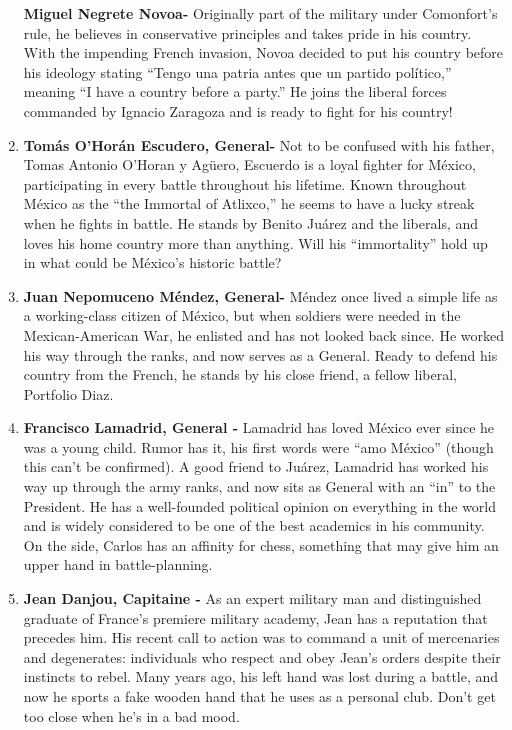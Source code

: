 \documentclass[10pt, letterpaper]{article}
\begin{document}
\begin{enumerate}
  \textbf{Miguel Negrete Novoa-} Originally part of the military under
  Comonfort's rule, he believes in conservative principles and takes
  pride in his country. With the impending French invasion, Novoa
  decided to put his country before his ideology stating ``Tengo una
  patria antes que un partido político,'' meaning ``I have a country
  before a party.'' He joins the liberal forces commanded by Ignacio
  Zaragoza and is ready to fight for his country!
  
\item
  
  \textbf{Tomás O'Horán Escudero, General-} Not to be confused with his
  father, Tomas Antonio O'Horan y Agüero, Escuerdo is a loyal fighter
  for México, participating in every battle throughout his lifetime.
  Known throughout México as the ``the Immortal of Atlixco,'' he seems
  to have a lucky streak when he fights in battle. He stands by Benito
  Juárez and the liberals, and loves his home country more than
  anything. Will his ``immortality'' hold up in what could be México's
  historic battle?
  
\item
  
  \textbf{Juan Nepomuceno Méndez, General-} Méndez once lived a simple
  life as a working-class citizen of México, but when soldiers were
  needed in the Mexican-American War, he enlisted and has not looked
  back since. He worked his way through the ranks, and now serves as a
  General. Ready to defend his country from the French, he stands by his
  close friend, a fellow liberal, Portfolio Diaz.
  
\item
  
  \textbf{Francisco Lamadrid, General -} Lamadrid has loved México ever
  since he was a young child. Rumor has it, his first words were ``amo
  México'' (though this can't be confirmed). A good friend to Juárez,
  Lamadrid has worked his way up through the army ranks, and now sits as
  General with an ``in'' to the President. He has a well-founded
  political opinion on everything in the world and is widely considered
  to be one of the best academics in his community. On the side, Carlos
  has an affinity for chess, something that may give him an upper hand
  in battle-planning.
  
\item
  
  \textbf{Jean Danjou, Capitaine -} As an expert military man and
  distinguished graduate of France's premiere military academy, Jean has
  a reputation that precedes him. His recent call to action was to
  command a unit of mercenaries and degenerates: individuals who respect
  and obey Jean's orders despite their instincts to rebel. Many years
  ago, his left hand was lost during a battle, and now he sports a fake
  wooden hand that he uses as a personal club. Don't get too close when
  he's in a bad mood.
  

\end{enumerate}
\end{document}
